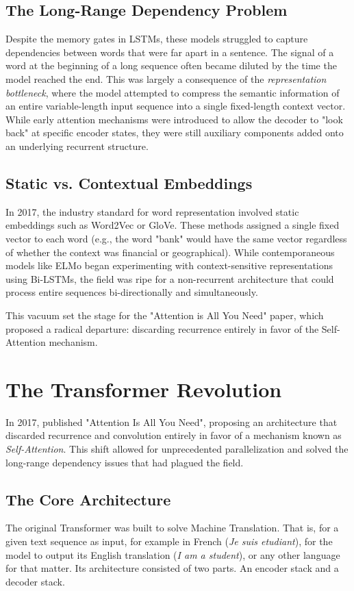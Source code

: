 \documentclass[a4paper,12pt]{article}
\begin{document}
\subsection{The Long-Range Dependency Problem}
Despite the memory gates in LSTMs, these models struggled to capture dependencies between words that were far apart in a sentence. The signal of a word at the beginning of a long sequence often became diluted by the time the model reached the end. This was largely a consequence of the \textit{representation bottleneck}, where the model attempted to compress the semantic information of an entire variable-length input sequence into a single fixed-length context vector. While early attention mechanisms \citep{bahdanau2014neural} were introduced to allow the decoder to "look back" at specific encoder states, they were still auxiliary components added onto an underlying recurrent structure.

\subsection{Static vs. Contextual Embeddings}
In 2017, the industry standard for word representation involved static embeddings such as Word2Vec or GloVe. These methods assigned a single fixed vector to each word (e.g., the word "bank" would have the same vector regardless of whether the context was financial or geographical). While contemporaneous models like ELMo began experimenting with context-sensitive representations using Bi-LSTMs, the field was ripe for a non-recurrent architecture that could process entire sequences bi-directionally and simultaneously.

This vacuum set the stage for the "Attention is All You Need" paper, which proposed a radical departure: discarding recurrence entirely in favor of the Self-Attention mechanism.

\section{The Transformer Revolution}
In 2017, \cite{vaswani2017attention} published "Attention Is All You Need", proposing an architecture that discarded recurrence and convolution entirely in favor of a mechanism known as \textit{Self-Attention}. This shift allowed for unprecedented parallelization and solved the long-range dependency issues that had plagued the field.

\subsection{The Core Architecture}
The original Transformer was built to solve Machine Translation. That is, for a given text sequence as input, for example in French (\textit{Je suis etudiant}), for the model to output its English translation (\textit{I am a student}), or any other language for that matter. Its architecture consisted of two parts. An encoder stack and a decoder stack.
\end{document}

